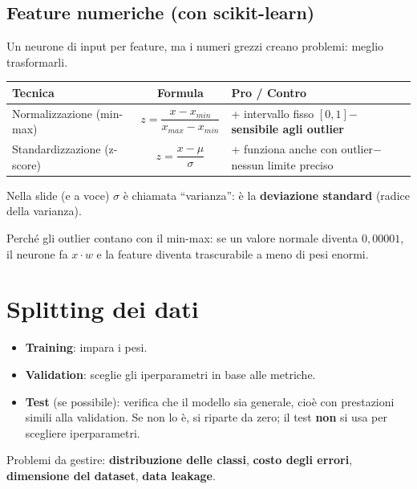 \subsection{Feature numeriche (con scikit-learn)}
Un neurone di input per feature, ma i numeri grezzi creano problemi: meglio trasformarli.
\begin{center}
\renewcommand{\arraystretch}{1.6}
\begin{tabularx}{\textwidth}{l c X}
\toprule
\textbf{Tecnica} & \textbf{Formula} & \textbf{Pro / Contro}\\
\midrule
Normalizzazione (min-max) & $z = \dfrac{x - x_{min}}{x_{max}-x_{min}}$ & + intervallo fisso $[0,1]$\newline $-$ \textbf{sensibile agli outlier}\\
Standardizzazione (z-score) & $z = \dfrac{x-\mu}{\sigma}$ & + funziona anche con outlier\newline $-$ nessun limite preciso\\
\bottomrule
\end{tabularx}
\end{center}
\begin{attenzione}
Nella slide (e a voce) $\sigma$ è chiamata ``varianza'': è la \textbf{deviazione standard} (radice della varianza).
\end{attenzione}
Perché gli outlier contano con il min-max: se un valore normale diventa $0{,}00001$, il neurone fa $x\cdot w$ e la feature
diventa trascurabile a meno di pesi enormi.

\section{Splitting dei dati}
\begin{itemize}
  \item \textbf{Training}: impara i pesi.
  \item \textbf{Validation}: sceglie gli iperparametri in base alle metriche.
  \item \textbf{Test} (se possibile): verifica che il modello sia generale, cioè con prestazioni simili alla validation.
        Se non lo è, si riparte da zero; il test \textbf{non} si usa per scegliere iperparametri.
\end{itemize}
Problemi da gestire: \textbf{distribuzione delle classi}, \textbf{costo degli errori}, \textbf{dimensione del dataset},
\textbf{data leakage}.

